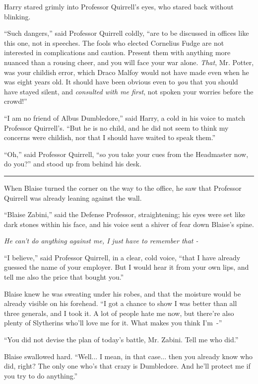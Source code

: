 Harry stared grimly into Professor Quirrell's eyes, who stared back without blinking.

``Such dangers,'' said Professor Quirrell coldly, ``are to be discussed in offices like this one, not in speeches. The fools who elected Cornelius Fudge are not interested in complications and caution. Present them with anything more nuanced than a rousing cheer, and you will face your war alone. \emph{That}, Mr. Potter, was your childish error, which Draco Malfoy would not have made even when he was eight years old. It should have been obvious even to \emph{you} that you should have stayed silent, and \emph{consulted with me first}, not spoken your worries before the crowd!''

``I am no friend of Albus Dumbledore,'' said Harry, a cold in his voice to match Professor Quirrell's. ``But he is no child, and he did not seem to think my concerns were childish, nor that I should have waited to speak them.''

``Oh,'' said Professor Quirrell, ``so you take your cues from the Headmaster now, do you?'' and stood up from behind his desk.

\begin{center}\rule{3in}{0.4pt}\end{center}

When Blaise turned the corner on the way to the office, he saw that Professor Quirrell was already leaning against the wall.

``Blaise Zabini,'' said the Defense Professor, straightening; his eyes were set like dark stones within his face, and his voice sent a shiver of fear down Blaise's spine.

\emph{He can't do anything against me, I just have to remember that -}

``I believe,'' said Professor Quirrell, in a clear, cold voice, ``that I have already guessed the name of your employer. But I would hear it from your own lips, and tell me also the price that bought you.''

Blaise knew he was sweating under his robes, and that the moisture would be already visible on his forehead. ``I got a chance to show I was better than all three generals, and I took it. A lot of people hate me now, but there're also plenty of Slytherins who'll love me for it. What makes you think I'm~-''

``You did not devise the plan of today's battle, Mr. Zabini. Tell me who did.''

Blaise swallowed hard. ``Well... I mean, in that case... then you already know who did, right? The only one who's that crazy is Dumbledore. And he'll protect me if you try to do anything.''


